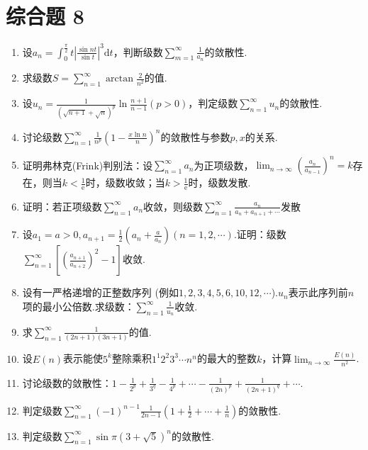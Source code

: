 \section{综合题 8}
\begin{enumerate}
	\item 设$a_{n}=\int_{0}^{\frac{\pi}{2}} t\left|\frac{\sin n t}{\sin t}\right|^{3} \mathrm{d} t$，判断级数$\sum_{m=1}^{\infty} \frac{1}{a_{n}}$的敛散性.
	\item 求级数$S=\sum_{n=1}^{\infty} \arctan \frac{2}{n^{2}}$的值.
	\item 设$u_{n}=\frac{1}{(\sqrt{n+1}+\sqrt{n})^{p}} \ln \frac{n+1}{n-1}(p>0)$，判定级数$\sum_{n=1}^{\infty} u_{n}$的敛散性.
	\item 讨论级数$\sum_{n=1}^{\infty} \frac{1}{n^{p}}\left(1-\frac{x \ln n}{n}\right)^{n}$的敛散性与参数$p,x$的关系.
	\item 证明弗林克(Frink)判别法：设$\sum_{n=1}^{\infty} a_{n}$为正项级数，$\lim _{n \rightarrow \infty}\left(\frac{a_{n}}{a_{n-1}}\right)^{n}=k$存在，则当$k<\frac{1}{\mathrm{e}}$时，级数收敛；当$k>\frac{1}{\mathrm{e}}$时，级数发散.
	
	\item 证明：若正项级数$\sum_{n=1}^{\infty} a_{n}$收敛，则级数$\sum_{n=1}^{\infty} \frac{a_{n}}{a_{n}+a_{n+1}+\cdots}$发散
	
	\item 设$a_{1}=a>0, a_{n+1}=\frac{1}{2}\left(a_{n}+\frac{a}{a_{n}}\right)(n=1,2, \cdots)$.证明：级数$\sum_{n=1}^{\infty}\left[\left(\frac{a_{n+1}}{a_{n+2}}\right)^{2}-1\right]$收敛.
	\item 设有一严格递增的正整数序列 (例如$1,2,3,4,5,6,10, 12, \cdots$).$u_{n}$表示此序列前$n$项的最小公倍数.求级数：$\sum_{n=1}^{\infty}\frac{1}{u_{n}}$收敛.
	\item 求$\sum_{n=1}^{\infty} \frac{1}{(2 n+1)(3 n+1)}$的值.
	\item 设$E(n)$表示能使$5^{k}$整除乘积$1^{1} 2^{2} 3^{3} \cdots n^{n}$的最大的整数$k$，计算$\lim _{n \rightarrow \infty} \frac{E(n)}{n^{2}}$.
	
	\item 讨论级数的敛散性：$1-\frac{1}{2^{p}}+\frac{1}{3^{q}}-\frac{1}{4^{p}}+\cdots-\frac{1}{(2 n)^{p}}+\frac{1}{(2 n+1)^{q}}+\cdots$.
	\item 判定级数$\sum_{n=1}^{\infty}(-1)^{n-1} \frac{1}{2 n-1}\left(1+\frac{1}{2}+\cdots+\frac{1}{n}\right)$的敛散性.
	
	\item 判定级数$\sum_{n=1}^{\infty} \sin \pi(3+\sqrt{5})^{n}$的敛散性.
	

\end{enumerate}
